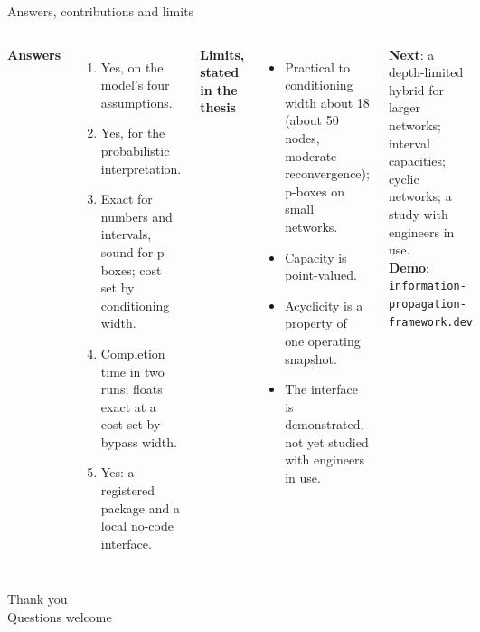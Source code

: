 \documentclass[aspectratio=169,11pt]{beamer}
\begin{document}
\begin{frame}{Answers, contributions and limits}
\begin{columns}[T]
\small
\textbf{Answers}
\begin{enumerate}
  \item Yes, on the model's four assumptions.
  \item Yes, for the probabilistic interpretation.
  \item Exact for numbers and intervals, sound for p-boxes; cost set by conditioning width.
  \item Completion time in two runs; floats exact at a cost set by bypass width.
  \item Yes: a registered package and a local no-code interface.
\end{enumerate}
\small
\textbf{Limits, stated in the thesis}
\begin{itemize}
  \item Practical to conditioning width about 18 (about 50 nodes, moderate reconvergence); p-boxes on small networks.
  \item Capacity is point-valued.
  \item Acyclicity is a property of one operating snapshot.
  \item The interface is demonstrated, not yet studied with engineers in use.
\end{itemize}
\smallskip
\footnotesize\textbf{Next}: a depth-limited hybrid for larger networks; interval capacities; cyclic
networks; a study with engineers in use.\\[2pt]
\textbf{Demo}: \texttt{information-propagation-framework.dev}
\end{columns}
\end{frame}

\begin{frame}[plain]
\centering\vfill\Large Thank you\\[8pt]
\normalsize Questions welcome\vfill
\end{frame}
\end{document}
